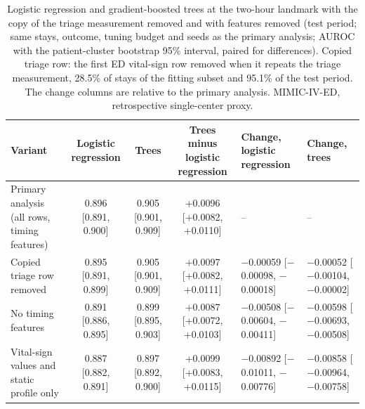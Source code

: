 \begin{table}[t]
\centering
\caption{Logistic regression and gradient-boosted trees at the two-hour landmark with the copy of the triage measurement removed and with features removed (test period; same stays, outcome, tuning budget and seeds as the primary analysis; AUROC with the patient-cluster bootstrap 95\% interval, paired for differences). Copied triage row: the first ED vital-sign row removed when it repeats the triage measurement, 28.5\% of stays of the fitting subset and 95.1\% of the test period. The change columns are relative to the primary analysis. MIMIC-IV-ED, retrospective single-center proxy.}
\label{tab:dedup}
\begin{tabular}{lcccll}
\toprule
Variant & Logistic regression & Trees & Trees minus logistic regression & Change, logistic regression & Change, trees \\
\midrule
Primary analysis (all rows, timing features) & 0.896 [0.891, 0.900] & 0.905 [0.901, 0.909] & +0.0096 [+0.0082, +0.0110] & -- & -- \\
Copied triage row removed & 0.895 [0.891, 0.899] & 0.905 [0.901, 0.909] & +0.0097 [+0.0082, +0.0111] & \ensuremath{-}0.00059 [\ensuremath{-}0.00098, \ensuremath{-}0.00018] & \ensuremath{-}0.00052 [\ensuremath{-}0.00104, \ensuremath{-}0.00002] \\
No timing features & 0.891 [0.886, 0.895] & 0.899 [0.895, 0.903] & +0.0087 [+0.0072, +0.0103] & \ensuremath{-}0.00508 [\ensuremath{-}0.00604, \ensuremath{-}0.00411] & \ensuremath{-}0.00598 [\ensuremath{-}0.00693, \ensuremath{-}0.00508] \\
Vital-sign values and static profile only & 0.887 [0.882, 0.891] & 0.897 [0.892, 0.900] & +0.0099 [+0.0083, +0.0115] & \ensuremath{-}0.00892 [\ensuremath{-}0.01011, \ensuremath{-}0.00776] & \ensuremath{-}0.00858 [\ensuremath{-}0.00964, \ensuremath{-}0.00758] \\
\bottomrule
\end{tabular}
\end{table}
